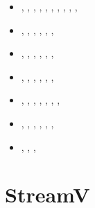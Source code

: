 \begin{small}
\begin{itemize}
                               \textcite{deli19},  \textcite{pact19}, \textcite{nana19},
                               \textcite{cohf19},  \textcite{crcm19},
                               \textcite{ulcw19},  \textcite{gicw19},
                               \textcite{jart19},  \textcite{jart19b}
\item[\twothousandtwenty]      \textcite{lalt20},  \textcite{gugb20},
                               \textcite{yabt20},  \textcite{arcf20}, 
                               \textcite{rits20},  \textcite{grlc20}, 
                               \textcite{scrt20},  \textcite{lorb20},
                               \textcite{bobm20},  \textcite{kacc20},
                               \textcite{uprc20}
\item[\twothousandtwentyone]   \textcite{roac21},  \textcite{lalt21}, \textcite{mebl21},
                               \textcite{gult21},  \textcite{gubt21}, \textcite{naka21},
                               \textcite{naka21}
\item[\twothousandtwentytwo]   \textcite{lids22},  \textcite{hulz22}, \textcite{adss22},
                               \textcite{bamo22},  \textcite{lalt22}, \textcite{gugt22},
                               \textcite{bota22}
\item[\twothousandtwentythree] \textcite{quzj23},  \textcite{titl23}, \textcite{lizl23},
                               \textcite{adsm23},  \textcite{gudl23}, \textcite{lelm23},
                               \textcite{naka23}
\item[\twothousandtwentyfour]  \textcite{jalt24},  \textcite{deba24}, \textcite{chrg24},
                               \textcite{masw24},  \textcite{shml24}, \textcite{lamt24},
                               \textcite{pagr24},  \textcite{guof24}
\item[\twothousandtwentyfive]  \textcite{semt25},  \textcite{gufj25}, \textcite{jacc25},
                               \textcite{lybl25},  \textcite{grlc25}, \textcite{burg25},
                               \textcite{gufj25}
\item[\twothousandtwentysix]   \textcite{degb26},  \textcite{licl26}, \textcite{lilz26b},
                               \textcite{masw26}

\end{itemize}
\end{small}

\section{StreamV} 

